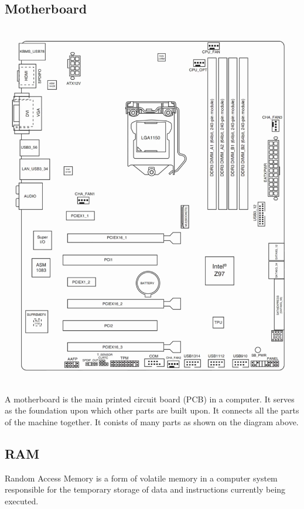 \documentclass[12pt, a4paper]{article}
\begin{document}
\subsection{Motherboard}
\begin{center}
  \includegraphics[scale=0.2]{motherboard.png}
\end{center}

A motherboard is the main printed circuit board (PCB) in a computer.
It serves as the foundation upon which other parts are built upon. 
It connects all the parts of the machine together. It conists of many 
parts as shown on the diagram above.

\subsection{RAM}
Random Access Memory is a form of volatile memory in a computer system
responsible for the temporary storage of data and instructions currently
being executed.
\end{document}
